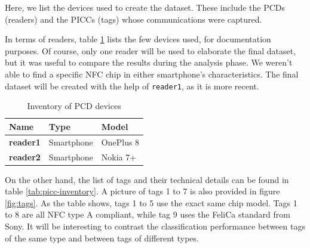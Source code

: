 Here, we list the devices used to create the dataset. These include the PCDs (readers) and the PICCs (tags) whose communications were captured.

In terms of readers, table \ref{tab:pcd-inventory} lists the few devices used, for documentation purposes. Of course, only one reader will be used to elaborate the final dataset, but it was useful to compare the results during the analysis phase. We weren't able to find a specific NFC chip in either smartphone's characteristics. The final dataset will be created with the help of \texttt{reader1}, as it is more recent.

\begin{table}[h!]
  \centering
  \begin{tabular}{|l|l|l|}
    \hline
    \textbf{Name}    & \textbf{Type} & \textbf{Model} \\ \hline
    \textbf{reader1} & Smartphone    & OnePlus 8      \\ \hline
    \textbf{reader2} & Smartphone    & Nokia 7+       \\ \hline
  \end{tabular}
  \caption{Inventory of PCD devices}
  \label{tab:pcd-inventory}
\end{table}

On the other hand, the list of tags and their technical details can be found in table \ref{tab:picc-inventory}. A picture of tags 1 to 7 is also provided in figure \ref{fig:tags}. As the table shows, tags 1 to 5 use the exact same chip model. Tags 1 to 8 are all NFC type A compliant, while tag 9 uses the FeliCa standard from Sony. It will be interesting to contrast the classification performance between tags of the same type and between tags of different types.

